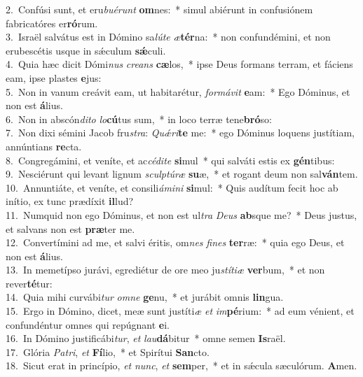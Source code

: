 {2.~}Confúsi sunt, et eru\textit{bu}\textit{é}\textit{runt} \textbf{om}nes:~* simul abiérunt in confusiónem fabricatóres er\textbf{ró}rum.\\
{3.~}Israël salvátus est in Dómino sa\textit{lú}\textit{te} \textit{æ}\textbf{tér}na:~* non confundémini, et non erubescétis usque in sǽculum \textbf{sǽ}culi.\\
{4.~}Quia hæc dicit Dómi\textit{nus} \textit{cre}\textit{ans} \textbf{cæ}los,~* ipse Deus formans terram, et fáciens eam, ipse plastes \textbf{e}jus:\\
{5.~}Non in vanum creávit eam, ut habitarétur, \textit{for}\textit{má}\textit{vit} \textbf{e}am:~* Ego Dóminus, et non est \textbf{á}lius.\\
{6.~}Non in abscón\textit{di}\textit{to} \textit{lo}\textbf{cú}tus sum,~* in loco terræ tene\textbf{bró}so:\\
{7.~}Non dixi sémini Jacob fru\textit{stra}: \textit{Quǽ}\textit{ri}\textbf{te} me:~* ego Dóminus loquens justítiam, annúntians \textbf{re}cta.\\
{8.~}Congregámini, et veníte, et ac\textit{cé}\textit{di}\textit{te} \textbf{si}mul~* qui salváti estis ex \textbf{gén}tibus:\\
{9.~}Nesciérunt qui levant lignum \textit{scul}\textit{ptú}\textit{ræ} \textbf{su}æ,~* et rogant deum non sal\textbf{ván}tem.\\
{10.~}Annuntiáte, et veníte, et consili\textit{á}\textit{mi}\textit{ni} \textbf{si}mul:~* Quis audítum fecit hoc ab inítio, ex tunc prædíxit \textbf{il}lud?\\
{11.~}Numquid non ego Dóminus, et non est ul\textit{tra} \textit{De}\textit{us} \textbf{ab}sque me?~* Deus justus, et salvans non est \textbf{præ}ter me.\\
{12.~}Convertímini ad me, et salvi éritis, om\textit{nes} \textit{fi}\textit{nes} \textbf{ter}ræ:~* quia ego Deus, et non est \textbf{á}lius.\\
{13.~}In memetípso jurávi, egrediétur de ore meo ju\textit{stí}\textit{ti}\textit{æ} \textbf{ver}bum,~* et non rever\textbf{té}tur:\\
{14.~}Quia mihi curvábi\textit{tur} \textit{om}\textit{ne} \textbf{ge}nu,~* et jurábit omnis \textbf{lin}gua.\\
{15.~}Ergo in Dómino, dicet, meæ sunt justíti\textit{æ} \textit{et} \textit{im}\textbf{pé}rium:~* ad eum vénient, et confundéntur omnes qui repúgnant \textbf{e}i.\\
{16.~}In Dómino justificábi\textit{tur}, \textit{et} \textit{lau}\textbf{dá}bitur~* omne semen \textbf{Is}raël.\\
{17.~}Glória \textit{Pa}\textit{tri}, \textit{et} \textbf{Fí}lio,~* et Spirítui \textbf{San}cto.\\
{18.~}Sicut erat in princípio, \textit{et} \textit{nunc}, \textit{et} \textbf{sem}per,~* et in sǽcula sæculórum. \textbf{A}men.\\
